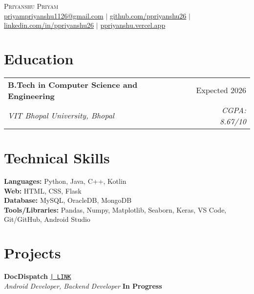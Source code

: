 \documentclass[a4paper,10pt]{article}
\makeatletter
\newcommand{\resumeSubheading}[4]{
  \vspace{1pt}\item
    \begin{tabular*}{\textwidth}{l@{\extracolsep{\fill}}r}
      \textbf{#1} & #2 \\
      \textit{\small#3} & \textit{\small #4} \\
    \end{tabular*}
}
\makeatother
\begin{document}
\begin{center}
  {\Huge \scshape Priyanshu Priyam} \\ \vspace{1pt}
  \href{mailto:priyampriyanshu1126@gmail.com}{priyampriyanshu1126@gmail.com} $|$
  \href{https://github.com/ppriyanshu26}{github.com/ppriyanshu26} $|$
  \href{https://linkedin.com/in/ppriyanshu26}{linkedin.com/in/ppriyanshu26} $|$
  \href{https://ppriyanshu.vercel.app/}{ppriyanshu.vercel.app}
\end{center}

\section{Education}

\vspace{-4pt}
\begin{flushleft}
  \hspace{1.5em}
  \resumeSubheading
    {B.Tech in Computer Science and Engineering}{Expected 2026}
    {VIT Bhopal University, Bhopal}{CGPA: 8.67/10}
\end{flushleft}

\section{Technical Skills}

\vspace{-4pt}
\hspace{1.5em}
\begin{flushleft}
  \textbf{Languages:} Python, Java, C++, Kotlin \\[6pt]
  \textbf{Web:} HTML, CSS, Flask \\[6pt]
  \textbf{Database:} MySQL, OracleDB, MongoDB \\[6pt]
  \textbf{Tools/Libraries:} Pandas, Numpy, Matplotlib, Seaborn, Keras, VS Code, Git/GitHub, Android Studio
\end{flushleft}



\section{Projects}

\noindent
\textbf{DocDispatch}
\href{https://github.com/yashpreeto7/DocDispatch}{\texttt{| LINK}} \\
\textit{Android Developer, Backend Developer} \hfill \textbf{In Progress} \\[-8pt]
\end{document}
